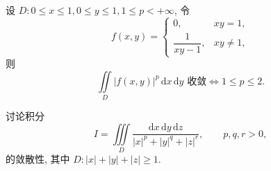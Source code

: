 \documentclass[../数学分析培优讲义.tex]{subfiles}
\begin{document}
\begin{example}
设 $D:0\leq x\leq1,0\leq y\leq1,1\leq p<+\infty$, 令
\[
    f(x,y)=
    \begin{cases}
        0,&xy=1,\\
        \dfrac{1}{xy-1},&xy\ne1,
    \end{cases}
\]
则
\[
    \iint\limits_D|f(x,y)|^p\,\mathrm{d}x\,\mathrm{d}y\text{ 收敛}
    \iff1\leq p\leq2.
\]
\end{example}
\exampleblank

\begin{example}
讨论积分
\[
    I=\iiint\limits_D\dfrac{\mathrm{d}x\,\mathrm{d}y\,\mathrm{d}z}{|x|^p+|y|^q+|z|^r},
    \qquad p,q,r>0,
\]
的敛散性, 其中 $D:|x|+|y|+|z|\geq1$.
\end{example}
\exampleblank
\end{document}

